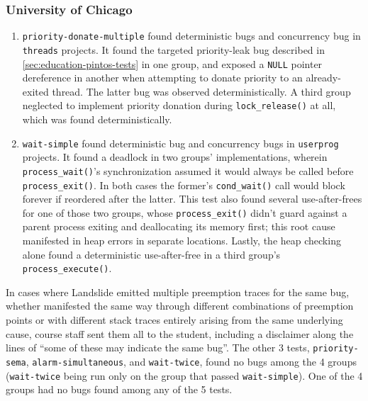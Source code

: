 \subsubsection{University of Chicago}
\label{sec:education-eval-bugs-uc}


\begin{enumerate}
	\item {\tt priority-donate-multiple} found 
		deterministic bugs and  concurrency bug in {\tt threads} projects.
		It found the targeted priority-leak bug
		described in \cref{sec:education-pintos-tests} in one group,
		and exposed a {\tt NULL} pointer dereference in another
		when attempting to donate priority to an already-exited thread.
		The latter bug was observed deterministically.
		A third group neglected to implement priority donation during {\tt lock\_release()} at all,
		which was found deterministically.
	\item {\tt wait-simple} found  deterministic bug
		and  concurrency bugs in {\tt userprog} projects.
		It found a deadlock in two groups' implementations,
		wherein {\tt process\_\allowbreak{}wait()}'s synchronization assumed
		it would always be called before {\tt process\_exit()}.
		In both cases the former's {\tt cond\_wait()} call would block forever if reordered after the latter.
		This test also found several use-after-frees for one of those two groups,
		whose {\tt process\_exit()} didn't guard against a parent process exiting and deallocating its memory first;
		this root cause manifested in heap errors in  separate locations.
		Lastly, the heap checking alone found a deterministic use-after-free in a third group's {\tt process\_execute()}.
\end{enumerate}

In cases where Landslide emitted multiple preemption traces for the same bug,
whether manifested the same way through different combinations of preemption points
or with different stack traces entirely arising from the same underlying cause,
course staff sent them all to the student,
including a disclaimer along the lines of ``some of these may indicate the same bug''.
%
The other 3 tests, {\tt priority-sema}, {\tt alarm-simultaneous}, and {\tt wait-twice},
found no bugs among the 4 groups
({\tt wait-twice} being run only on the group that passed {\tt wait-simple}).
One of the 4 groups had no bugs found among any of the 5 tests.

